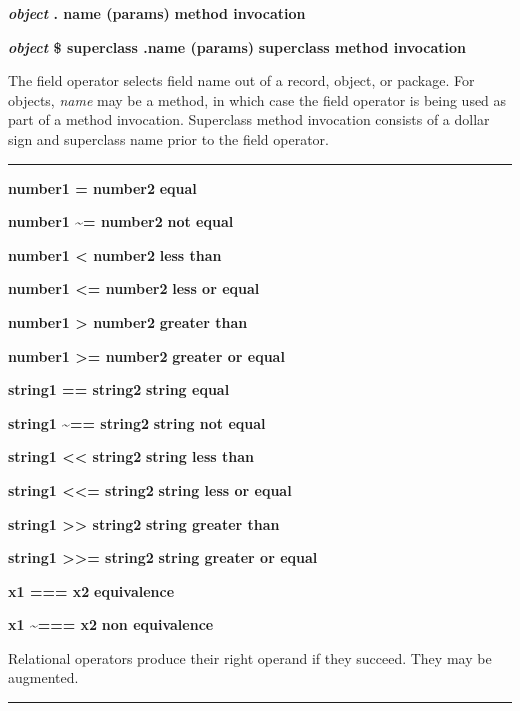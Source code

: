 \noindent
{\bf \textit{object} . name (params) } \hfill {\bf method invocation}

\noindent
{\bf \textit{object} \$ superclass .name (params) } \hfill {\bf superclass method invocation}

\noindent
The field operator selects field name out of a record,
object, or package. For objects, \textit{name} may be a method, in
which case the field operator is being used as part of a method
invocation. Superclass method invocation consists of a dollar sign and
superclass name prior to the field operator.

\bigskip\hrule\vspace{0.1cm}
\noindent
{\bf number1 = number2 } \hfill {\bf equal}

\noindent
{}
{\bf number1 \~{}= number2 } \hfill {\bf not equal}

\noindent
{\bf number1 {\textless} number2 } \hfill {\bf less than}

\noindent
{\bf number1 {\textless}= number2 } \hfill {\bf less or equal}

\noindent
{\bf number1 {\textgreater} number2 } \hfill {\bf greater than}

\noindent
{\bf number1 {\textgreater}= number2 } \hfill {\bf greater or equal}

\noindent
{\bf string1 == string2 } \hfill {\bf string equal}

\noindent
{\bf string1 \~{}== string2 } \hfill {\bf string not equal}

\noindent
{\bf string1 {\textless}{\textless} string2 } \hfill {\bf string less than}

\noindent
{\bf string1 {\textless}{\textless}= string2 } \hfill {\bf string less or equal}

\noindent
{\bf string1 {\textgreater}{\textgreater} string2 } \hfill {\bf string greater than}

\noindent
{\bf string1 {\textgreater}{\textgreater}= string2 } \hfill {\bf string greater or equal}

\noindent
{\bf x1 === x2 } \hfill {\bf equivalence}

\noindent
{\bf x1 \~{}=== x2 } \hfill {\bf non equivalence}

\noindent
Relational operators produce their right operand if they succeed. They
may be augmented.

\bigskip\hrule\vspace{0.1cm}


